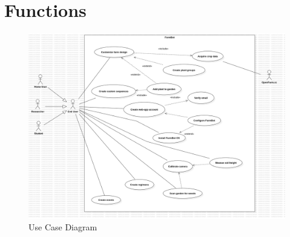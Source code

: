 \section{Functions}

\begin{figure}[H]
    \centering
    \includegraphics[width=1\textwidth]{UML Diagrams/UseCaseDiagram1.png}
    \caption{Use Case Diagram}
    \label{fig:use-case-diagram}
\end{figure}


